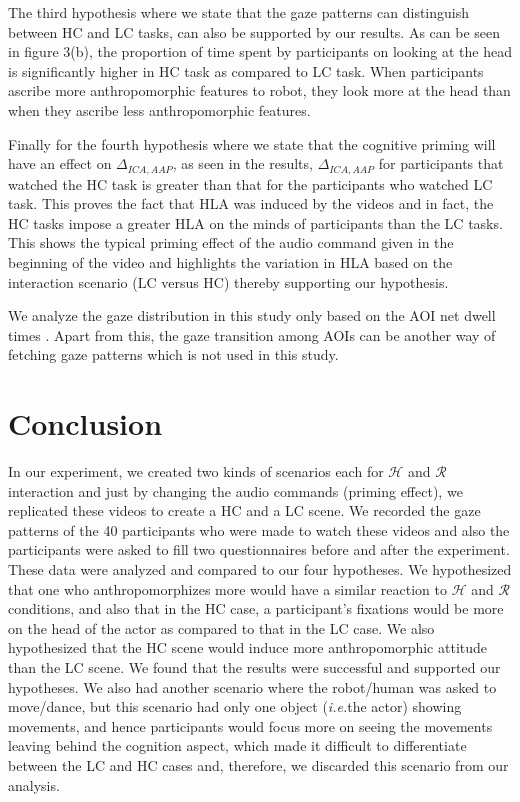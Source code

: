 \documentclass{acm_proc_article-sp}
\newcommand{\ie}{{\textit{i.e.\xspace}}}
\begin{document}
The third hypothesis where we state that the gaze patterns can distinguish
between HC and LC tasks, can also be supported by our results. As can be seen in
figure 3(b), the proportion of time spent by participants on looking at the head
is significantly higher in HC task as compared to LC task. When participants
ascribe more anthropomorphic features to robot, they look more at the head than
when they ascribe less anthropomorphic features.

Finally for the fourth hypothesis where we state that the cognitive priming will
have an effect on $\Delta_{ICA,AAP}$, as seen in the results, $\Delta_{ICA,AAP}$
for participants that watched the HC task is greater than that for the
participants who watched LC task. This proves the fact that HLA was induced by
the videos and in fact, the HC tasks impose a greater HLA on the minds of
participants than the LC tasks. This shows the typical priming effect of the
audio command given in the beginning of the video and highlights the variation
in HLA based on the interaction scenario (LC versus HC) thereby supporting our
hypothesis. 

We analyze the gaze distribution in this study only based on the AOI net dwell
times . Apart from this, the gaze transition among AOIs can be another way of
fetching gaze patterns which is not used in this study.

\section{Conclusion}

In our experiment, we created two kinds of scenarios each for $\mathcal{H}$ and
$\mathcal{R}$ interaction and just by changing the audio commands (priming
effect), we replicated these videos to create a HC and a LC scene. We recorded
the gaze patterns of the 40 participants who were made to watch these videos and
also the participants were asked to fill two questionnaires before and after the
experiment. These data were analyzed and compared to our four hypotheses. We
hypothesized that one who anthropomorphizes more would have a similar reaction
to $\mathcal{H}$ and $\mathcal{R}$ conditions, and also that in the HC case, a
participant's fixations would be more on the head of the actor as compared to
that in the LC case. We also hypothesized that the HC scene would induce more
anthropomorphic attitude than the LC scene. We found that the results were
successful and supported our hypotheses. We also had another scenario where the
robot/human was asked to move/dance, but this scenario had only one object
(\ie the actor) showing movements, and hence participants would focus
more on seeing the movements leaving behind the cognition aspect, which made it
difficult to differentiate between the LC and HC cases and, therefore, we
discarded this scenario from our analysis.





%
%
\end{document}
